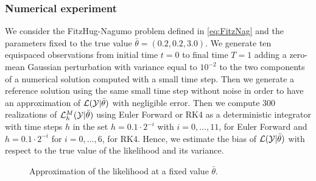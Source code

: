 \subsubsection{Numerical experiment}

We consider the FitzHug-Nagumo problem defined in \eqref{eq:FitzNag} and the parameters fixed to the true value $\bar\theta = (0.2, 0.2, 3.0)$. We generate ten equispaced observations from initial time $t = 0$ to final time $T = 1$ adding a zero-mean Gaussian perturbation with variance equal to $10^{-2}$ to the two components of a numerical solution computed with a small time step. Then we generate a reference solution using the same small time step without noise in order to have an approximation of $\mathcal{L}(\mathcal{Y}|\bar \theta)$ with negligible error. Then we compute 300 realizations of $\mathcal{L}_h^M(\mathcal{Y}|\bar \theta)$ using Euler Forward or RK4 as a deterministic integrator with time steps $h$ in the set $h = 0.1\cdot 2^{-i}$ with $i = 0, \ldots, 11$, for Euler Forward and $h = 0.1\cdot2^{-i}$ for $i = 0, \ldots, 6$, for RK4. Hence, we estimate the bias of $\mathcal{L}(\mathcal{Y}|\bar \theta)$ with respect to the true value of the likelihood and its variance.

\begin{figure}
	\centering
	\resizebox{0.6\linewidth}{!}{}
	\caption{Approximation of the likelihood at a fixed value $\bar \theta$.}
	\label{fig:MonteCarloVarianceH}
\end{figure}